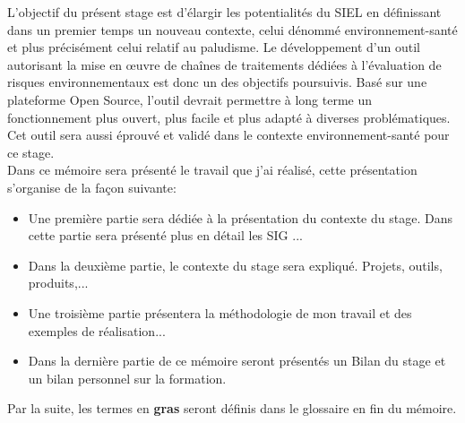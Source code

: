 L'objectif du présent stage est d'élargir les potentialités du SIEL en définissant dans un premier temps un nouveau contexte, celui dénommé environnement-santé et plus précisément celui relatif au paludisme. Le développement d'un outil autorisant la mise en \oe uvre de chaînes de traitements dédiées à l'évaluation de risques environnementaux est donc un des objectifs poursuivis. Basé sur une plateforme Open Source, l'outil devrait permettre à long terme un fonctionnement plus ouvert, plus facile et plus adapté à diverses problématiques. Cet outil sera aussi éprouvé et validé dans le contexte environnement-santé pour ce stage. \\


Dans ce mémoire sera présenté le travail que j'ai réalisé, cette présentation s'organise de la façon suivante:\newline

\begin{itemize}
\item Une première partie sera dédiée à la présentation du contexte du stage. Dans cette partie sera présenté plus en détail les SIG ...\\

\item Dans la deuxième partie, le contexte du stage sera expliqué. Projets, outils, produits,...\\

\item Une troisième partie présentera la méthodologie de mon travail et des exemples de réalisation...\\

\item Dans la dernière partie de ce mémoire seront présentés un Bilan du stage et un bilan personnel sur la formation.\newline

\end{itemize}

Par la suite, les termes en \textbf{gras} seront définis dans le glossaire en fin du mémoire.

